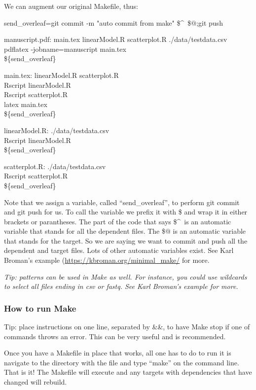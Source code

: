 \documentclass{article}
\begin{document}
We can augment our original Makefile, thus:

send\_overleaf=git commit -m "auto commit from make" \$\textasciicircum\ \$$@$;git push

manuscript.pdf: main.tex linearModel.R scatterplot.R ./data/testdata.csv\\
\tab pdflatex -jobname=manuscript main.tex\\
\tab \$\{send\_overleaf\}

main.tex: linearModel.R scatterplot.R\\
\tab Rscript linearModel.R\\
\tab Rscript scatterplot.R\\
\tab latex main.tex\\
\tab \$\{send\_overleaf\}

linearModel.R: ./data/testdata.csv\\
\tab Rscript linearModel.R\\
\tab \$\{send\_overleaf\}

scatterplot.R: ./data/testdata.csv\\
\tab Rscript scatterplot.R\\
\tab \$\{send\_overleaf\}

Note that we assign a variable, called ``send\_overleaf'', to perform git commit and git push for us. To call the variable we prefix it with \$ and wrap it in either brackets or parantheses. The part of the code that says \$\textasciicircum\ is an automatic variable that stands for all the dependent files. The \$$@$ is an automatic variable that stands for the target. So we are saying we want to commit and push all the dependent and target files. Lots of other automatic variables exist. See Karl Broman's example (\url{https://kbroman.org/minimal_make/} for more.

\emph{Tip: patterns can be used in {\sf Make} as well. For instance, you could use wildcards to select all files ending in csv or fastq. See Karl Broman's example for more.}

\subsubsection{How to run {\sf Make}}

Tip: place instructions on one line, separated by &&, to have Make stop if one of commands throws an error. This can be very useful and is recommended.

Once you have a Makefile in place that works, all one has to do to run it is navigate to the directory with the file and type ``make'' on the command line. That is it! The Makefile will execute and any targets with dependencies that have changed will rebuild. 
\end{document}
